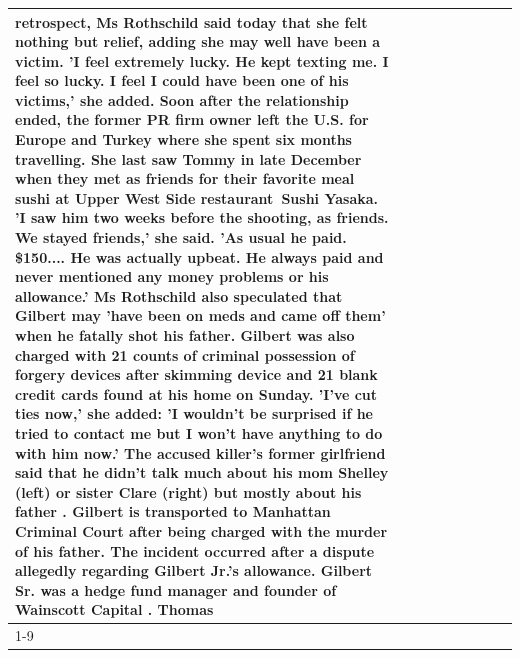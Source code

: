 \begin{table}[H]
\begin{tabular}{lllrlllll}
retrospect, Ms Rothschild said today that she felt nothing but relief, adding she may well have been a victim. 'I feel extremely lucky. He kept texting me. I feel so lucky. I feel I could have been one of his victims,' she added. Soon after the relationship ended, the former PR firm owner left the U.S. for Europe and Turkey where she spent six months  travelling. She last saw Tommy in late December when they met as friends for their favorite meal sushi at Upper West Side restaurant Sushi Yasaka. 'I saw him two weeks before the shooting, as friends. We stayed friends,' she said. 'As usual he paid. \$150.... He was actually upbeat. He always paid and never mentioned any money problems or his allowance.' Ms Rothschild also speculated that Gilbert may 'have been on meds and came off them' when he fatally shot his father. Gilbert was also charged with 21 counts of criminal possession of forgery devices after skimming device and 21 blank credit cards found at his home on Sunday. 'I've cut ties now,' she added: 'I wouldn’t be surprised if he tried to contact me but I won’t have anything to do with him now.' The accused killer's former girlfriend said that he didn't talk much about his mom Shelley (left) or sister Clare (right) but mostly about his father . Gilbert is transported to Manhattan Criminal Court  after being charged with the murder of his father. The incident occurred after a dispute allegedly regarding Gilbert Jr.'s allowance. Gilbert Sr. was a hedge fund manager and founder of Wainscott Capital . Thomas \\
\cline{1-9} \cline{2-9}

\end{tabular}
\end{table}
